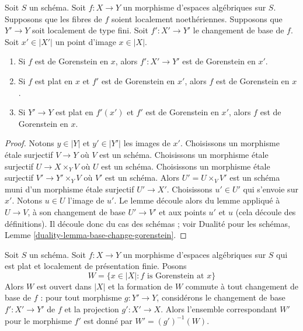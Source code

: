 \begin{lemma}
\label{lemma-base-change-gorenstein}
Soit $S$ un schéma.
Soit $f : X \to Y$ un morphisme d'espaces algébriques sur $S$.
Supposons que les fibres de $f$ soient localement noethériennes.
Supposons que $Y' \to Y$ soit localement de type fini. Soit $f' : X' \to Y'$
le changement de base de $f$.
Soit $x' \in |X'|$ un point d'image $x \in |X|$.
\begin{enumerate}
\item Si $f$ est de Gorenstein en $x$, alors
$f' : X' \to Y'$ est de Gorenstein en $x'$.
\item Si $f$ est plat en $x$ et $f'$ est de Gorenstein en $x'$, alors $f$
est de Gorenstein en $x$.
\item Si $Y' \to Y$ est plat en $f'(x')$ et $f'$ est de Gorenstein en
$x'$, alors $f$ est de Gorenstein en $x$.
\end{enumerate}
\end{lemma}

\begin{proof}
Notons $y \in |Y|$ et $y' \in |Y'|$ les images de $x'$.
Choisissons un morphisme étale surjectif $V \to Y$ où $V$ est un schéma.
Choisissons un morphisme étale surjectif $U \to X \times_Y V$ où
$U$ est un schéma.
Choisissons un morphisme étale surjectif $V' \to Y' \times_Y V$
où $V'$ est un schéma.
Alors $U' = U \times_V V'$ est un schéma muni
d'un morphisme étale surjectif $U' \to X'$.
Choisissons $u' \in U'$ qui s'envoie sur $x'$. Notons $u \in U$ l'image de $u'$.
Le lemme découle alors du lemme appliqué à
$U \to V$, à son changement de base $U' \to V'$ et aux
points $u'$ et $u$ (cela découle des définitions).
Il découle donc du cas des schémas ; voir
Dualité pour les schémas, Lemme \ref{duality-lemma-base-change-gorenstein}.
\end{proof}

\begin{lemma}
\label{lemma-flat-finite-presentation-gorenstein-open}
Soit $S$ un schéma.
Soit $f : X \to Y$ un morphisme d'espaces algébriques sur $S$
qui est plat et localement de présentation finie. Posons
$$
W = \{x \in |X| : f\text{ is Gorenstein at }x\}
$$
Alors $W$ est ouvert dans $|X|$ et la formation de $W$
commute à tout changement de base de $f$ :
pour tout morphisme $g : Y' \to Y$, considérons
le changement de base $f' : X' \to Y'$ de $f$ et la
projection $g' : X' \to X$. Alors l'ensemble correspondant
$W'$ pour le morphisme $f'$ est donné par $W' = (g')^{-1}(W)$.
\end{lemma}

